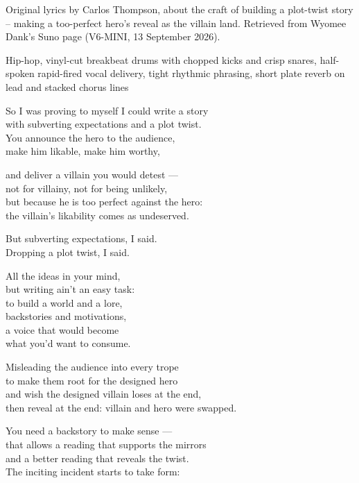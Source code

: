 
\label{sec:writing-aint-easy}
\begin{notes}
Original lyrics by Carlos Thompson, about the craft of building a plot-twist story -- making a too-perfect hero's reveal as the villain land. Retrieved from Wyomee Dank's Suno page (V6-MINI, 13 September 2026).
\end{notes}
\begin{style}
Hip-hop, vinyl-cut breakbeat drums with chopped kicks and crisp snares, half-spoken rapid-fired vocal delivery, tight rhythmic phrasing, short plate reverb on lead and stacked chorus lines
\end{style}
\begin{lyrics}
So I was proving to myself I could write a story\\
with subverting expectations and a plot twist.\\
You announce the hero to the audience,\\
make him likable, make him worthy,

and deliver a villain you would detest —\\
not for villainy, not for being unlikely,\\
but because he is too perfect against the hero:\\
the villain's likability comes as undeserved.

But subverting expectations, I said.\\
Dropping a plot twist, I said.

All the ideas in your mind,\\
but writing ain't an easy task:\\
to build a world and a lore,\\
backstories and motivations,\\
a voice that would become\\
what you'd want to consume.

Misleading the audience into every trope\\
to make them root for the designed hero\\
and wish the designed villain loses at the end,\\
then reveal at the end: villain and hero were swapped.

You need a backstory to make sense —\\
that allows a reading that supports the mirrors\\
and a better reading that reveals the twist.\\
The inciting incident starts to take form:


\end{lyrics}
